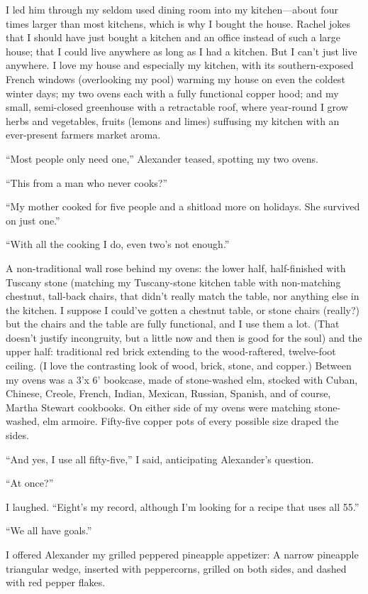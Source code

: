 I led him through my seldom used dining room into my kitchen---about
four times larger than most kitchens, which is why I bought the house.
Rachel jokes that I should have just bought a kitchen and an office
instead of such a large house; that I could live anywhere as long as I
had a kitchen. But I can't just live anywhere. I love my house and
especially my kitchen, with its southern-exposed French windows
(overlooking my pool) warming my house on even the coldest winter days;
my two ovens each with a fully functional copper hood; and my small,
semi-closed greenhouse with a retractable roof, where year-round I grow
herbs and vegetables, fruits (lemons and limes) suffusing my kitchen
with an ever-present farmers market aroma.

``Most people only need one,'' Alexander teased, spotting my two ovens.

``This from a man who never cooks?''

``My mother cooked for five people and a shitload more on holidays. She
survived on just one.''

``With all the cooking I do, even two's not enough.''

A non-traditional wall rose behind my ovens: the lower half,
half-finished with Tuscany stone (matching my Tuscany-stone kitchen
table with non-matching chestnut, tall-back chairs, that didn't really
match the table, nor anything else in the kitchen. I suppose I could've
gotten a chestnut table, or stone chairs (really?) but the chairs and
the table are fully functional, and I use them a lot. (That doesn't
justify incongruity, but a little now and then is good for the soul) and
the upper half: traditional red brick extending to the wood-raftered,
twelve-foot ceiling. (I love the contrasting look of wood, brick, stone,
and copper.) Between my ovens was a 3'x 6' bookcase, made of
stone-washed elm, stocked with Cuban, Chinese, Creole, French, Indian,
Mexican, Russian, Spanish, and of course, Martha Stewart cookbooks. On
either side of my ovens were matching stone-washed, elm armoire.
Fifty-five copper pots of every possible size draped the sides.

``And yes, I use all fifty-five,'' I said, anticipating Alexander's
question.

``At once?''

I laughed. ``Eight's my record, although I'm looking for a recipe that
uses all 55.''

``We all have goals.''

I offered Alexander my grilled peppered pineapple appetizer: A narrow
pineapple triangular wedge, inserted with peppercorns, grilled on both
sides, and dashed with red pepper flakes.

